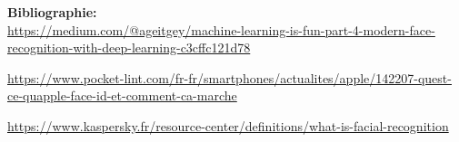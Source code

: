 \documentclass{beamer}
\begin{document}
\begin{columns}[t]
	\begin{column}{0.8\textwidth}	
	\color{blancCreme}
	{\bf Bibliographie:} \\
\url{https://medium.com/@ageitgey/machine-learning-is-fun-part-4-modern-face-recognition-with-deep-learning-c3cffc121d78}

\url{https://www.pocket-lint.com/fr-fr/smartphones/actualites/apple/142207-quest-ce-quapple-face-id-et-comment-ca-marche}

\url{https://www.kaspersky.fr/resource-center/definitions/what-is-facial-recognition}
	\end{column}
\end{columns}
\end{document}
